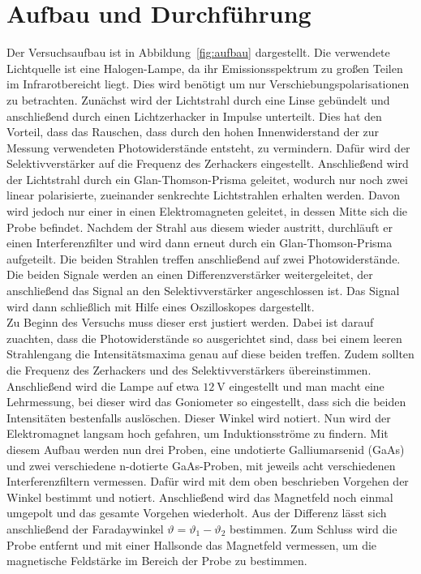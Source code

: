 \section{Aufbau und Durchführung}
Der Versuchsaufbau ist in Abbildung~\ref{fig:aufbau} dargestellt. Die verwendete Lichtquelle ist eine Halogen-Lampe, da ihr Emissionsspektrum
zu großen Teilen im Infrarotbereicht liegt. Dies wird benötigt um nur Verschiebungspolarisationen zu betrachten. Zunächst wird der Lichtstrahl durch
eine Linse gebündelt und anschließend durch einen Lichtzerhacker in Impulse unterteilt. Dies hat den Vorteil, dass das Rauschen, dass durch den hohen
Innenwiderstand der zur Messung verwendeten Photowiderstände entsteht, zu vermindern. Dafür wird der Selektivverstärker auf die Frequenz des Zerhackers eingestellt.
Anschließend wird der Lichtstrahl durch ein Glan-Thomson-Prisma geleitet, wodurch nur noch zwei linear polarisierte, zueinander senkrechte Lichtstrahlen
erhalten werden. Davon wird jedoch nur einer in einen Elektromagneten geleitet, in dessen Mitte sich die Probe befindet. Nachdem der Strahl aus
diesem wieder austritt, durchläuft er einen Interferenzfilter und wird dann erneut durch ein Glan-Thomson-Prisma aufgeteilt. Die beiden Strahlen treffen
anschließend auf zwei Photowiderstände. Die beiden Signale werden an einen Differenzverstärker weitergeleitet, der anschließend das Signal an den Selektivverstärker
angeschlossen ist. Das Signal wird dann schließlich mit Hilfe eines Oszilloskopes dargestellt.\\


Zu Beginn des Versuchs muss dieser erst justiert werden. Dabei ist darauf zuachten, dass die Photowiderstände so ausgerichtet sind,
dass bei einem leeren Strahlengang die Intensitätsmaxima genau auf diese beiden treffen. Zudem sollten die Frequenz des Zerhackers und des
Selektivverstärkers übereinstimmen.
Anschließend wird die Lampe auf etwa $\SI{12}{\volt}$ eingestellt und man macht eine Lehrmessung, bei dieser wird das Goniometer so eingestellt,
dass sich die beiden Intensitäten bestenfalls auslöschen. Dieser Winkel wird notiert. Nun wird der Elektromagnet langsam hoch gefahren, um
Induktionsströme zu findern.
Mit diesem Aufbau werden nun drei Proben, eine undotierte Galliumarsenid (GaAs) und zwei verschiedene n-dotierte GaAs-Proben, mit jeweils
acht verschiedenen Interferenzfiltern vermessen. Dafür wird mit dem oben beschrieben Vorgehen der Winkel bestimmt und notiert. Anschließend
wird das Magnetfeld noch einmal umgepolt und das gesamte Vorgehen wiederholt. Aus der Differenz lässt sich anschließend der Faradaywinkel
$\vartheta = \vartheta_1 - \vartheta_2$ bestimmen.
Zum Schluss wird die Probe entfernt und mit einer Hallsonde das Magnetfeld vermessen, um die magnetische Feldstärke im Bereich der Probe zu bestimmen.
